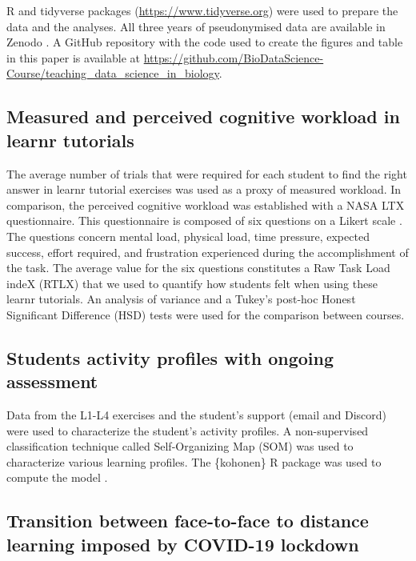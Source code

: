 \documentclass{aims}
\theoremstyle{definition}
\begin{document}
R and tidyverse \cite{Wickham2019} packages
(\url{https://www.tidyverse.org}) were used to prepare the data and the
analyses. All three years of pseudonymised data are available in Zenodo
\cite{Grosjeandataset2020, Grosjeandataset2019, Grosjeandataset2018}. A
GitHub repository with the code used to create the figures and table in
this paper is available at
\url{https://github.com/BioDataScience-Course/teaching_data_science_in_biology}.

\hypertarget{measured-and-perceived-cognitive-workload-in-learnr-tutorials}{%
\subsection{Measured and perceived cognitive workload in learnr
tutorials}\label{measured-and-perceived-cognitive-workload-in-learnr-tutorials}}

The average number of trials that were required for each student to find
the right answer in learnr tutorial exercises was used as a proxy of
measured workload. In comparison, the perceived cognitive workload was
established with a NASA LTX questionnaire. This questionnaire is
composed of six questions on a Likert scale \cite{Hart1988}. The
questions concern mental load, physical load, time pressure, expected
success, effort required, and frustration experienced during the
accomplishment of the task. The average value for the six questions
constitutes a Raw Task Load indeX (RTLX) \cite{Byers1989} that we used
to quantify how students felt when using these learnr tutorials. An
analysis of variance and a Tukey's post-hoc Honest Significant
Difference (HSD) tests were used for the comparison between courses.

\hypertarget{students-activity-profiles-with-ongoing-assessment}{%
\subsection{Students activity profiles with ongoing
assessment}\label{students-activity-profiles-with-ongoing-assessment}}

Data from the L1-L4 exercises and the student's support (email and
Discord) were used to characterize the student's activity profiles. A
non-supervised classification technique called Self-Organizing Map (SOM)
\cite{Kohonen1995} was used to characterize various learning profiles.
The \{kohonen\} R package was used to compute the model
\cite{Wehrens2018}.

\hypertarget{transition-between-face-to-face-to-distance-learning-imposed-by-covid-19-lockdown}{%
\subsection{Transition between face-to-face to distance learning imposed
by COVID-19
lockdown}\label{transition-between-face-to-face-to-distance-learning-imposed-by-covid-19-lockdown}}
\end{document}
